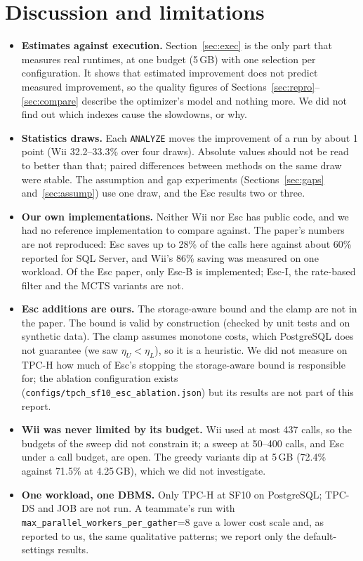 \documentclass[11pt,a4paper]{article}
\begin{document}
\section{Discussion and limitations}\label{sec:limits}
\begin{itemize}
\item \textbf{Estimates against execution.} Section~\ref{sec:exec} is the only part that measures real runtimes, at one budget (5\,GB) with one selection per configuration. It shows that estimated improvement does not predict measured improvement, so the quality figures of Sections~\ref{sec:repro}--\ref{sec:compare} describe the optimizer's model and nothing more. We did not find out which indexes cause the slowdowns, or why.
\item \textbf{Statistics draws.} Each \texttt{ANALYZE} moves the improvement of a run by about 1 point (Wii 32.2--33.3\% over four draws). Absolute values should not be read to better than that; paired differences between methods on the same draw were stable. The assumption and gap experiments (Sections~\ref{sec:gaps} and~\ref{sec:assump}) use one draw, and the Esc results two or three.
\item \textbf{Our own implementations.} Neither Wii nor Esc has public code, and we had no reference implementation to compare against. The paper's numbers are not reproduced: Esc saves up to 28\% of the calls here against about 60\% reported for SQL Server, and Wii's 86\% saving was measured on one workload. Of the Esc paper, only Esc-B is implemented; Esc-I, the rate-based filter and the MCTS variants are not.
\item \textbf{Esc additions are ours.} The storage-aware bound and the clamp are not in the paper. The bound is valid by construction (checked by unit tests and on synthetic data). The clamp assumes monotone costs, which PostgreSQL does not guarantee (we saw $\eta_U<\eta_L$), so it is a heuristic. We did not measure on TPC-H how much of Esc's stopping the storage-aware bound is responsible for; the ablation configuration exists (\texttt{configs/tpch\_sf10\_esc\_ablation.json}) but its results are not part of this report.
\item \textbf{Wii was never limited by its budget.} Wii used at most 437 calls, so the budgets of the sweep did not constrain it; a sweep at 50--400 calls, and Esc under a call budget, are open. The greedy variants dip at 5\,GB (72.4\% against 71.5\% at 4.25\,GB), which we did not investigate.
\item \textbf{One workload, one DBMS.} Only TPC-H at SF10 on PostgreSQL; TPC-DS and JOB are not run. A teammate's run with \texttt{max\_parallel\_workers\_per\_gather}=8 gave a lower cost scale and, as reported to us, the same qualitative patterns; we report only the default-settings results.
\end{itemize}
\end{document}
